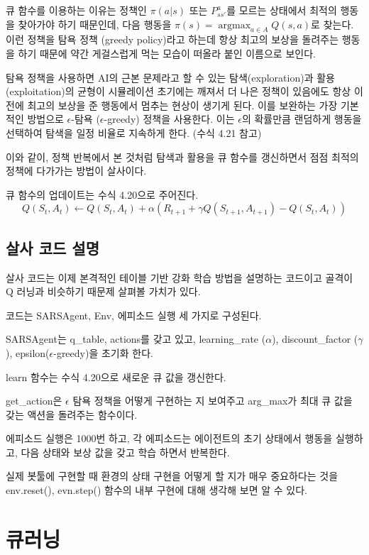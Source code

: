 \documentclass[ %
    a4paper,    %
    amsmath,    %
    itemph,     %
]{oblivoir}     %
\DeclareMathOperator*{\argmax}{argmax}
\begin{document}
큐 함수를 이용하는 이유는 정책인 $\pi(a|s)$ 또는 $P_{ss'}^a$를 모르는 상태에서 
최적의 행동을 찾아가야 하기 때문인데, 다음 행동을 $\pi(s) = \argmax_{a \in A} Q(s, a)$로 
찾는다. 이런 정책을 탐욕 정책 (greedy policy)라고 하는데 항상 최고의 보상을 돌려주는 
행동을 하기 때문에 약간 게걸스럽게 먹는 모습이 떠올라 붙인 이름으로 보인다. 

탐욕 정책을 사용하면 AI의 근본 문제라고 할 수 있는 탐색(exploration)과 활용(exploitation)의 
균형이 시뮬레이션 초기에는 깨져서 더 나은 정책이 있음에도 항상 이전에 최고의 보상을 
준 행동에서 멈추는 현상이 생기게 된다. 이를 보완하는 가장 기본적인 방법으로 
$\epsilon$-탐욕 ($\epsilon$-greedy) 정책을 사용한다. 이는 $\epsilon$의 확률만큼 
랜덤하게 행동을 선택하여 탐색을 일정 비율로 지속하게 한다. (수식 4.21 참고)

이와 같이, 정책 반복에서 본 것처럼 탐색과 활용을 큐 함수를 갱신하면서 점점 
최적의 정책에 다가가는 방법이 살사이다. 

큐 함수의 업데이트는 수식 4.20으로 주어진다. 
$$
Q(S_t, A_t) \leftarrow Q(S_t, A_t) + \alpha(R_{t+1} + \gamma Q(S_{t+1}, A_{t+1}) - Q(S_t, A_t))
$$

\subsection{살사 코드 설명}

살사 코드는 이제 본격적인 테이블 기반 강화 학습 방법을 설명하는 코드이고 
골격이 Q 러닝과 비슷하기 때문제 살펴볼 가치가 있다. 

코드는 SARSAgent, Env, 에피소드 실행 세 가지로 구성된다. 

SARSAgent는 q\_table, actions를 갖고 있고, learning\_rate ($\alpha$), 
discount\_factor ($\gamma$), epsilon($\epsilon$-greedy)을 초기화 한다. 

learn 함수는 수식 4.20으로 새로운 큐 값을 갱신한다. 

get\_action은 $\epsilon$ 탐욕 정책을 어떻게 구현하는 지 보여주고
arg\_max가 최대 큐 값을 갖는 액션을 돌려주는 함수이다. 

에피소드 실행은 1000번 하고, 각 에피소드는 에이전트의 초기 상태에서 
행동을 실행하고, 다음 상태와 보상 값을 갖고 학습 하면서 반복한다. 

실제 봇툴에 구현할 때 환경의 상태 구현을 어떻게 할 지가 매우 
중요하다는 것을 env.reset(), evn.step() 함수의 내부 구현에 대해 
생각해 보면 알 수 있다. 

\section{큐러닝}
\end{document}
